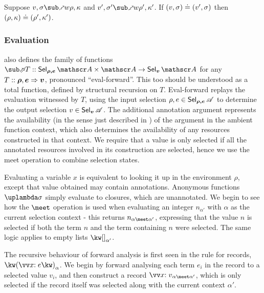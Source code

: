 \begin{lemma}
   Suppose $v, \sigma \matchFwdR{w} \rho, \kappa$ and $v', \sigma' \matchFwdR{w} \rho', \kappa'$. If $(v, \sigma) \doteq (v', \sigma)$ then $(\rho, \kappa) \doteq (\rho', \kappa')$.
\end{lemma}

\subsubsection{Evaluation}

 also defines the family of functions $\evalFwdF{T} :: \Prod{\Sel{\rho, e}{A}}{\Ann{A}} \to \Sel{v}{A}$ for any $T :: \bm{\rho}, \bm{e} \Rightarrow \bm{v}$, pronounced ``eval-forward''. This too should be understood as a total function, defined by structural recursion on $T$. Eval-forward replays the evaluation witnessed by $T$, using the input selection $\rho, e \in \textup{\textsf{Sel}}_{\bm{\rho,e}}\,{\mathscr{A}}$ to determine the output selection $v \in \textup{\textsf{Sel}}_{\bm{v}}\,{\mathscr{A}}$. The additional annotation argument represents the availability (in the sense just described in ) of the argument in the ambient function context, which also determines the availability of any resources constructed in that context. We require that a value is only selected if all the annotated resources involved in its construction are selected, hence we use the meet operation to combine selection states.

Evaluating a variable $x$ is equivalent to looking it up in the environment $\rho$, except that value obtained may contain annotations. Anonymous functions $\exLambda{\sigma}$ simply evaluate to closures, which are unannotated. We begin to see how the $\meet$ operation is used when evaluating an integer $n_{\alpha'}$ with $\alpha$ as the current selection context - this returns $\annot{n}{\alpha \meet \alpha'}$, expressing that the value $n$ is selected if both the term $n$ and the term containing $n$ were selected. The same logic applies to empty lists $\annot{\exNil}{\alpha'}$.

The recursive behaviour of forward analysis is first seen in the rule for records, $\exRec{\vec{\bind{x}{e}}}_{\alpha}$. We begin by forward analysing each term $e_i$ in the record to a selected value $v_i$, and then construct a record $\annot{\vec{\bind{x}{v}}}{\alpha \meet \alpha'}$, which is only selected if the record itself was selected along with the current context $\alpha'$.

